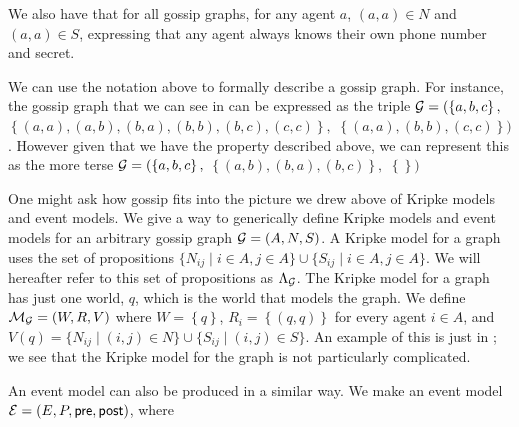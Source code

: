 \documentclass[10pt, a4paper]{report}
\begin{document}
We also have that for all gossip graphs, for any agent $a$, $(a, a) \in N$ and $(a, a)
 \in S$, expressing that any agent always knows their own phone number and
 secret.

\bigskip
 
We can use the notation above to formally describe a gossip graph. For instance,
the gossip graph that we can see in  can be expressed as
the triple $\mathcal{G} = (\left\{ a, b, c \right\},$ $ \left\{ (a, a), (a, b), (b, a), (b,
  b), (b, c), (c, c) \right\},$ $ \left\{ (a, a), (b, b), (c, c) \right\})$.
However given that we have the property described above, we can represent this
as the more terse $\mathcal{G} = (\left\{ a, b, c \right\},$ $ \left\{ (a, b), (b,
  a), (b, c)
\right\}, $ $ \left\{ \right\})$

\bigskip

One might ask how gossip fits into the picture we drew above of Kripke models
and event models. We give a way to generically define Kripke models and event
models for an arbitrary gossip graph $\mathcal{G} = (A, N, S)$. A Kripke model for a
graph  uses the set of propositions $\{N_{ij} \mid i \in A, j \in A\}
\cup \{S_{ij} \mid i \in A, j \in A\}$. We will hereafter refer to this set of
propositions as $\Lambda_{\mathcal{G}}$. The Kripke model for a graph  has
just one world, $q$, which is the world that models the graph. We define
$\mathcal{M_G} = (W, R, V)$ where $W = \left\{ q \right\}$, $R_i = \left\{ (q, q)
\right\}$ for every agent $i \in A$, and $V(q) = \{N _{ij} \mid (i, j) \in N\}
\cup \{S_{ij} \mid (i, j) \in S\}$. An example of this is just in
; we see that the Kripke model for the graph is not
particularly complicated. 

An event model can also be produced in a similar way. We make an event model
$\mathcal{E} = (E, P, \textsf{pre}, \textsf{post})$, where
\end{document}
